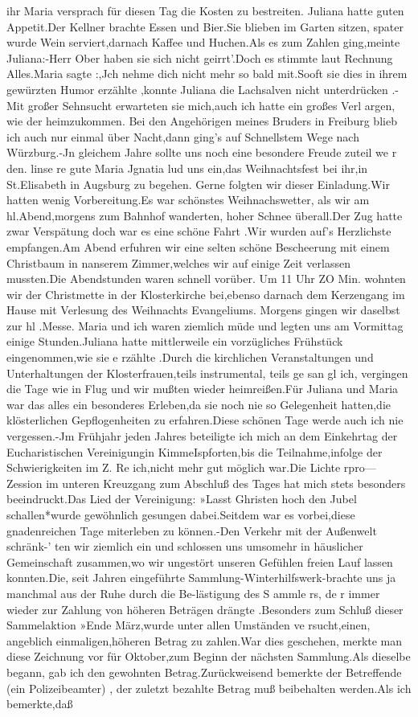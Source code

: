\documentclass[a4paper,11pt]{article}
\begin{document}
ihr Maria versprach für diesen Tag die Kosten zu bestreiten. Juliana hatte guten Appetit.Der Kellner brachte Essen und Bier.Sie blieben im Garten sitzen, spater wurde Wein serviert,darnach Kaffee und Huchen.Als es zum Zahlen ging,meinte Juliana:-Herr Ober haben sie sich nicht geirrt'.Doch es stimmte laut Rechnung Alles.Maria sagte :,Jch nehme dich nicht mehr so bald mit.Sooft sie dies in ihrem gewürzten Humor erzählte ,konnte Juliana die Lachsalven nicht unterdrücken .-Mit großer Sehnsucht erwarteten sie mich,auch ich hatte ein großes Verl argen, wie der heimzukommen. Bei den Angehörigen meines Bruders in Freiburg blieb ich auch nur einmal über Nacht,dann ging's auf Schnellstem Wege nach Würzburg.-Jn gleichem Jahre sollte uns noch eine besondere Freude zuteil we r den. linse re gute Maria Jgnatia lud uns ein,das Weihnachtsfest bei ihr,in St.Elisabeth in Augsburg zu begehen. Gerne folgten wir dieser Einladung.Wir hatten wenig Vorbereitung.Es war schönstes Weihnachswetter, als wir am hl.Abend,morgens zum Bahnhof wanderten, hoher Schnee überall.Der Zug hatte zwar Verspätung doch war es eine schöne Fahrt .Wir wurden auf's Herzlichste empfangen.Am Abend erfuhren wir eine selten schöne Bescheerung mit einem Christbaum in nanserem Zimmer,welches wir auf einige Zeit verlassen mussten.Die Abendstunden waren schnell vorüber. Um 11 Uhr ZO Min. wohnten wir der Christmette in der Klosterkirche bei,ebenso darnach dem Kerzengang im Hause mit Verlesung des Weihnachts Evangeliums. Morgens gingen wir daselbst zur hl .Messe. Maria und ich waren ziemlich müde und legten uns am Vormittag einige Stunden.Juliana hatte mittlerweile ein vorzügliches Frühstück eingenommen,wie sie e rzählte .Durch die kirchlichen Veranstaltungen und Unterhaltungen der Klosterfrauen,teils instrumental, teils ge san gl ich, vergingen die Tage wie in Flug und wir mußten wieder heimreißen.Für Juliana und Maria war das alles ein besonderes Erleben,da sie noch nie so Gelegenheit hatten,die klösterlichen Gepflogenheiten zu erfahren.Diese schönen Tage werde auch ich nie vergessen.-Jm Frühjahr jeden Jahres beteiligte ich mich an dem Einkehrtag der Eucharistischen Vereinigungin KimmeIspforten,bis die Teilnahme,infolge der Schwierigkeiten im Z. Re ich,nicht mehr gut möglich war.Die Lichte rpro— Zession im unteren Kreuzgang zum Abschluß des Tages hat mich stets besonders beeindruckt.Das Lied der Vereinigung: »Lasst Ghristen hoch den Jubel schallen*wurde gewöhnlich gesungen dabei.Seitdem war es vorbei,diese gnadenreichen Tage miterleben zu können.-Den Verkehr mit der Außenwelt schränk-’ ten wir ziemlich ein und schlossen uns umsomehr in häuslicher Gemeinschaft zusammen,wo wir ungestört unseren Gefühlen freien Lauf lassen konnten.Die, seit Jahren eingeführte Sammlung-Winterhilfswerk-brachte uns ja manchmal aus der Ruhe durch die Be-lästigung des S ammle rs, de r immer wieder zur Zahlung von höheren Beträgen drängte .Besonders zum Schluß dieser Sammelaktion »Ende März,wurde unter allen Umständen ve rsucht,einen, angeblich einmaligen,höheren Betrag zu zahlen.War dies geschehen, merkte man diese Zeichnung vor für Oktober,zum Beginn der nächsten Sammlung.Als dieselbe begann, gab ich den gewohnten Betrag.Zurückweisend bemerkte der Betreffende (ein Polizeibeamter) , der zuletzt bezahlte Betrag muß beibehalten werden.Als ich bemerkte,daß 
\end{document}
